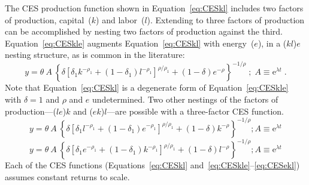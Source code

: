 \documentclass[preprint,10pt,3p]{elsarticle}\usepackage[]{graphicx}\usepackage[]{color}
\begin{document}
The CES production function shown in Equation~\ref{eq:CESkl} 
includes two factors of production, capital~($k$) and labor~($l$).
Extending to three factors of production can be accomplished by nesting
two factors of production against the third.
%
Equation~\ref{eq:CESkle} augments Equation~\ref{eq:CESkl} with energy~($e$),
in a ($kl$)$e$ nesting structure, as is common in the literature:
%
\begin{equation} \label{eq:CESkle}
  y = \theta \: A \: \left\{\delta \left[\delta_1 k^{-\rho_1}
      + (1-\delta_1)l^{-\rho_1} \right]^{\rho/\rho_1}
      + (1-\delta) e^{-\rho} \right\}^{-1/\rho} \; ; \;
      A \equiv \mathrm{e}^{\lambda t} \; .
\end{equation}
%
Note that Equation~\ref{eq:CESkl} is a degenerate form of Equation~\ref{eq:CESkle}
with $\delta = 1$ and $\rho$ and $e$ undetermined.
Two other nestings of the 
factors of production---($le$)$k$ and ($ek$)$l$---are possible 
with a three-factor CES function.
%
\begin{equation} \label{eq:CESlek}
  y = \theta \: A \: \left\{\delta \left[\delta_1 l^{-\rho_1}
      + (1-\delta_1) e^{-\rho_1} \right]^{\rho/\rho_1}
      + (1-\delta) k^{-\rho} \right\}^{-1/\rho};
      A \equiv \mathrm{e}^{\lambda t}
\end{equation}
%
\begin{equation} \label{eq:CESekl}
  y = \theta \: A \: \left\{\delta \left[\delta_1 e^{-\rho_1}
      + (1-\delta_1) k^{-\rho_1} \right]^{\rho/\rho_1}
      + (1-\delta) l^{-\rho} \right\}^{-1/\rho};
      A \equiv \mathrm{e}^{\lambda t}
\end{equation}
%
Each of the CES functions (Equations~\ref{eq:CESkl} 
and~\ref{eq:CESkle}--\ref{eq:CESekl}) assumes constant returns 
to scale.
\end{document}
